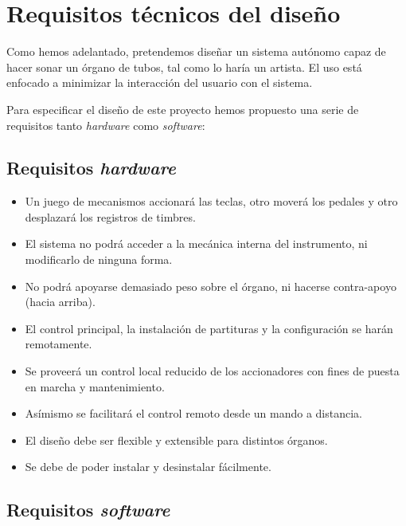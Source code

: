 \chapter{Requisitos técnicos del diseño}
\label{cap:capitulo_2}

Como hemos adelantado, pretendemos diseñar un sistema autónomo capaz de hacer sonar un órgano de tubos, tal como lo haría un artista. El uso está enfocado a minimizar la interacción del usuario con el sistema. 

Para especificar el diseño de este proyecto hemos propuesto una serie de requisitos tanto \textit{hardware} como \textit{software}:

\section{Requisitos \textit{hardware}}

\begin{itemize}
	
	\item Un juego de mecanismos accionará las teclas, otro moverá los pedales y otro desplazará los registros de timbres.
	
	\item El sistema no podrá acceder a la mecánica interna del instrumento, ni modificarlo de ninguna forma.
	
	\item No podrá apoyarse demasiado peso sobre el órgano, ni hacerse contra-apoyo (hacia arriba).
	
	\item El control principal, la instalación de partituras y la configuración se harán remotamente.
	
	\item Se proveerá un control local reducido de los accionadores con fines de puesta en marcha y mantenimiento.
	
	\item Asímismo se facilitará el control remoto desde un mando a distancia.
	
	\item El diseño debe ser flexible y extensible para distintos órganos.
	
	\item Se debe de poder instalar y desinstalar fácilmente.
	
\end{itemize}

\section{Requisitos \textit{software}}

